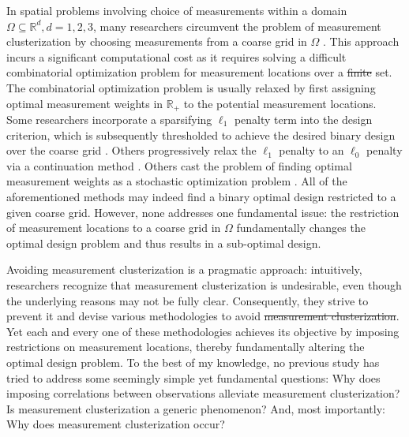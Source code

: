 \documentclass[ba]{imsart}
\theoremstyle{plain}
\theoremstyle{definition}
\theoremstyle{remark}
\providecommand{\DIFaddtex}[1]{{\protect\color{blue}\uwave{#1}}} %
\providecommand{\DIFdeltex}[1]{{\protect\color{red}\sout{#1}}}                      %
\providecommand{\DIFaddbegin}{} %
\providecommand{\DIFaddend}{} %
\providecommand{\DIFdelbegin}{} %
\providecommand{\DIFdelend}{} %
\providecommand{\DIFadd}[1]{\texorpdfstring{\DIFaddtex{#1}}{#1}} %
\providecommand{\DIFdel}[1]{\texorpdfstring{\DIFdeltex{#1}}{}} %
\newcommand{\DIFscaledelfig}{0.5}
\newlength{\DIFdelgraphicswidth} %
\newlength{\DIFdelgraphicsheight} %
\newcommand{\DIFaddincludegraphics}[2][]{{\color{blue}\fbox{\DIFOincludegraphics[#1]{#2}}}} %
\newcommand{\DIFdelincludegraphics}[2][]{%
\sbox{\DIFdelgraphicsbox}{\DIFOincludegraphics[#1]{#2}}%
\settoboxwidth{\DIFdelgraphicswidth}{\DIFdelgraphicsbox} %
\settoboxtotalheight{\DIFdelgraphicsheight}{\DIFdelgraphicsbox} %
\scalebox{\DIFscaledelfig}{%
\parbox[b]{\DIFdelgraphicswidth}{\usebox{\DIFdelgraphicsbox}\\[-\baselineskip] \rule{\DIFdelgraphicswidth}{0em}}\llap{\resizebox{\DIFdelgraphicswidth}{\DIFdelgraphicsheight}{%
\setlength{\unitlength}{\DIFdelgraphicswidth}%
\begin{picture}(1,1)%
\thicklines\linethickness{2pt} %
{\color[rgb]{1,0,0}\put(0,0){\framebox(1,1){}}}%
{\color[rgb]{1,0,0}\put(0,0){\line( 1,1){1}}}%
{\color[rgb]{1,0,0}\put(0,1){\line(1,-1){1}}}%
\end{picture}%
}\hspace*{3pt}}} %
} %
\DeclareRobustCommand{\DIFaddbegin}{\DIFOaddbegin \let\includegraphics\DIFaddincludegraphics} %
\DeclareRobustCommand{\DIFaddend}{\DIFOaddend \let\includegraphics\DIFOincludegraphics} %
\DeclareRobustCommand{\DIFdelbegin}{\DIFOdelbegin \let\includegraphics\DIFdelincludegraphics} %
\DeclareRobustCommand{\DIFdelend}{\DIFOaddend \let\includegraphics\DIFOincludegraphics} %
\begin{document}
In spatial problems involving choice of measurements within a domain
\(\Omega \subseteq \mathbb{R}^d, d=1,2,3\), many researchers
circumvent the problem of measurement clusterization by choosing
measurements from a coarse grid in \(\Omega\) \cite{koval2020,
  alexanderian2021, attia2022, alexanderian2014, alexanderian2016,
  alexanderian2018efficient, brunton2016}. This approach incurs a
significant computational cost as it requires solving a difficult
combinatorial optimization problem for measurement locations over a
\DIFdelbegin \DIFdel{finite }\DIFdelend \DIFaddbegin \DIFadd{discrete }\DIFaddend set. The combinatorial optimization problem is usually
relaxed by first assigning optimal measurement weights in
\(\mathbb{R}_+\) to the potential measurement locations. Some
researchers incorporate a sparsifying \(\ell_1\) penalty term into the
design criterion, which is subsequently thresholded to achieve the
desired binary design over the coarse grid
\cite{horesh2008borehole}. Others progressively relax the \(\ell_1\)
penalty to an \(\ell_0\) penalty via a continuation method
\cite{alexanderian2016, alexanderian2014}. Others cast the problem of
finding optimal measurement weights as a stochastic optimization
problem \cite{attia2022stochastic}. All of the aforementioned methods
may indeed find a binary optimal design restricted to a given coarse
grid. However, none addresses one fundamental issue: the restriction
of measurement locations to a coarse grid in \(\Omega\) fundamentally
changes the optimal design problem and thus results in a sub-optimal
design.

Avoiding measurement clusterization is a pragmatic approach:
intuitively, researchers recognize that measurement clusterization is
undesirable, even though the underlying reasons may not be fully
clear. Consequently, they strive to prevent it and devise various
methodologies to avoid \DIFdelbegin \DIFdel{measurement clusterization}\DIFdelend \DIFaddbegin \DIFadd{it}\DIFaddend . Yet each and every one of these
methodologies achieves its objective by imposing restrictions on
measurement locations, thereby fundamentally altering the optimal
design problem. To the best of my knowledge, no previous study has
tried to address some seemingly simple yet fundamental questions:
Why does imposing correlations between observations alleviate
measurement clusterization?
Is measurement clusterization a generic phenomenon? 
And, most importantly: Why does measurement clusterization occur?
\end{document}
